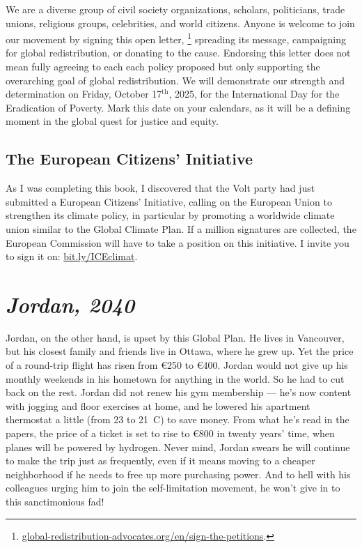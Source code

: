 \documentclass[a5paper,english,openany]{memoir}
\begin{document}
We are a diverse group of civil society organizations, scholars, politicians, trade unions, religious groups, celebrities, and world citizens. Anyone is welcome to join our movement by signing  %
this open letter,
\footnote{\href{https://global-redistribution-advocates.org/fr/signer-les-petitions/?238=true}{global-redistribution-advocates.org/en/sign-the-petitions}.} 
spreading its message, campaigning for global redistribution, or donating to the cause. Endorsing this letter does not mean fully agreeing to each each policy proposed but %
only supporting the overarching goal of global redistribution. We will demonstrate our strength and determination %
on Friday, October 17$^\text{th}$, 2025, for the International Day for the Eradication of Poverty. Mark this date on your calendars, as it will be %
a defining moment in the global quest for justice and equity.

\section*{The European Citizens' Initiative}

As I was completing %
this book, I discovered that the Volt party had just submitted a European Citizens' Initiative, calling on the European Union to strengthen its climate policy, in particular by promoting a worldwide climate union similar to the Global Climate Plan. If a million signatures are collected, the European Commission will have to take a position on this initiative. I invite you to sign it on: \href{https://citizens-initiative.europa.eu/initiatives/details/2024/000005_fr}{bit.ly/ICEclimat}.

\chapter*{\textit{Jordan, 2040}}\label{ch:narr_vancouver2}
Jordan, on the other hand, is upset by this Global Plan. He lives in Vancouver, but his closest family and friends live in Ottawa, where he grew up. Yet the price of a round-trip flight has risen from \euro{}250 to \euro{}400. Jordan would not give up his monthly weekends in his hometown for anything in the world. So he had to cut back on the rest. Jordan did not renew his gym membership --- he's now content with jogging and floor exercises at home, and he lowered his apartment thermostat a little (from 23 to 21~\textdegree{}C) to save money. From what he's read in the papers, the price of a ticket is set to rise to \euro{}800 in twenty years' time, when planes will be powered by hydrogen. Never mind, Jordan swears he will continue to make the trip just as frequently, even if it means moving to a cheaper neighborhood if he needs to free up more purchasing power. And to hell with his colleagues urging him to join the self-limitation movement, he won't give in to this sanctimonious fad!
\end{document}
